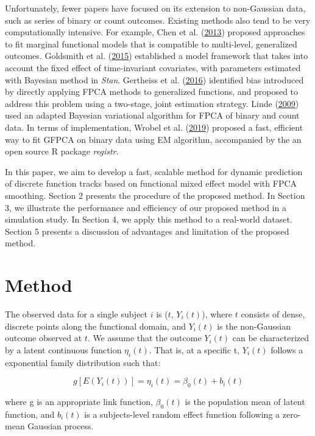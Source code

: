 \documentclass[
  11pt,
]{article}
\begin{document}
Unfortunately, fewer papers have focused on its extension to
non-Gaussian data, such as series of binary or count outcomes. Existing
methods also tend to be very computationally intensive. For example,
Chen et al. (\protect\hyperlink{ref-chen2013}{2013}) proposed approaches
to fit marginal functional models that is compatible to multi-level,
generalized outcomes. Goldsmith et al.
(\protect\hyperlink{ref-goldsmith2015}{2015}) established a model
framework that takes into account the fixed effect of time-invariant
covariates, with parameters estimated with Bayesian method in
\emph{Stan}. Gertheiss et al.
(\protect\hyperlink{ref-gertheiss2016}{2016}) identified bias introduced
by directly applying FPCA methods to generalized functions, and proposed
to address this problem using a two-stage, joint estimation strategy.
Linde (\protect\hyperlink{ref-linde2019}{2009}) used an adapted Bayesian
variational algorithm for FPCA of binary and count data. In terms of
implementation, Wrobel et al. (\protect\hyperlink{ref-wrobel2019}{2019})
proposed a fast, efficient way to fit GFPCA on binary data using EM
algorithm, accompanied by the an open source R package \emph{registr}.

In this paper, we aim to develop a fast, scalable method for dynamic
prediction of discrete function tracks based on functional mixed effect
model with FPCA smoothing. Section 2 presents the procedure of the
proposed method. In Section 3, we illustrate the performance and
efficiency of our proposed method in a simulation study. In Section 4,
we apply this method to a real-world dataset. Section 5 presents a
discussion of advantages and limitation of the proposed method.

\hypertarget{method}{%
\section{Method}\label{method}}

The observed data for a single subject \(i\) is (\(t\), \(Y_i(t)\)),
where \(t\) consists of dense, discrete points along the functional
domain, and \(Y_i(t)\) is the non-Gaussian outcome observed at \(t\). We
assume that the outcome \(Y_i(t)\) can be characterized by a latent
continuous function \(\eta_i(t)\). That is, at a specific t, \(Y_i(t)\)
follows a exponential family distribution such that:

\[
g[E(Y_i(t))] = \eta_i(t) = \beta_0(t)+b_i(t)
\]

where g is an appropriate link function, \(\beta_0(t)\) is the
population mean of latent function, and \(b_i(t)\) is a subjects-level
random effect function following a zero-mean Gaussian process.
\end{document}
